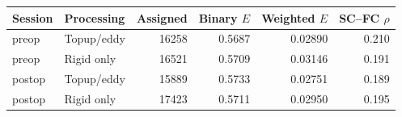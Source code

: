 \begin{tabular}{llrrrr}
\toprule
Session & Processing & Assigned & Binary $E$ & Weighted $E$ & SC--FC $\rho$ \\
\midrule
preop & Topup/eddy & 16258 & 0.5687 & 0.02890 & 0.210 \\
preop & Rigid only & 16521 & 0.5709 & 0.03146 & 0.191 \\
postop & Topup/eddy & 15889 & 0.5733 & 0.02751 & 0.189 \\
postop & Rigid only & 17423 & 0.5711 & 0.02950 & 0.195 \\
\bottomrule
\end{tabular}
